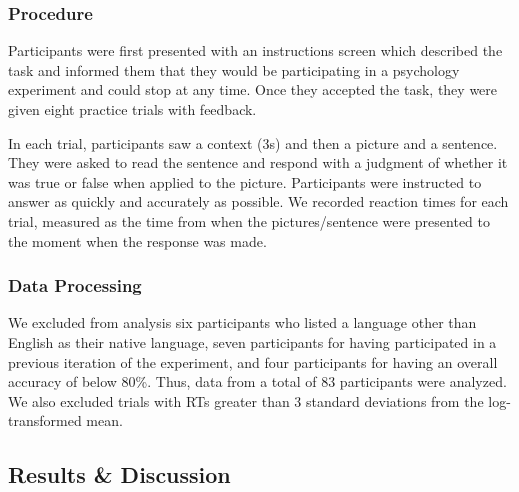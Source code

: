 \documentclass[10pt,letterpaper]{article}
\begin{document}
\subsubsection{Procedure}
Participants were first presented with an instructions screen which described the task and informed them that they would be participating in a psychology experiment and could stop at any time.  Once they accepted the task, they were given eight practice trials with feedback. 

In each trial, participants saw a context (3s) and then a picture and a sentence. They were asked to read the sentence and respond with a judgment of whether it was true or false when applied to the picture.  Participants were instructed to answer as quickly and accurately as possible.  We recorded reaction times for each trial, measured as the time from when the pictures/sentence were presented to the moment when the response was made.


\subsubsection{Data Processing}

We excluded from analysis six participants who listed a language other than English as their native language, seven participants for having participated in a previous iteration of the experiment, and four participants for having an overall accuracy of below 80\%.  Thus, data from a total of 83 participants were analyzed.  We also excluded trials with RTs greater than 3 standard deviations from the log-transformed mean.  

\subsection{Results \& Discussion}
\end{document}
